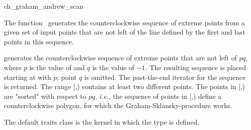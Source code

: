 

\begin{ccRefFunction}{ch_graham_andrew_scan}  %

\ccDefinition
  
The function \ccRefName\ generates the counterclockwise sequence of extreme
points from a given set of input points that are not left of the line defined
by the first and last points in this sequence.  



           {generates the counterclockwise sequence of extreme points that are
            not left of $pq$, where $p$ is the value of  and $q$ is
            the value of  $-1$. The resulting sequence is placed
            starting at  with $p$; point $q$ is omitted.  The
            past-the-end iterator for the sequence is returned.
            \ccPrecond %
            The range [,) contains at least
            two different points.
            The points in [,) are "sorted" with respect
            to $pq$, {\it i.e.}, the sequence of points in 
            [,) define a counterclockwise polygon, 
            for which the Graham-Sklansky-procedure \cite{s-mcrm-72} works.}

The default traits class  is the kernel in which the
type  is defined.



\end{ccRefFunction}
